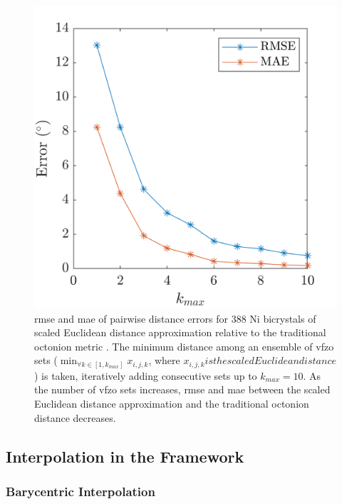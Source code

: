 \documentclass[preprint,12pt]{elsarticle}
\begin{document}
\begin{figure}
    \centering
    \includegraphics[scale=1]{figures/dist-ensemble-rmse-mae.png}
    \caption{\Gls{rmse} and \gls{mae} of pairwise distance errors for 388 Ni bicrystals \cite{olmstedSurveyComputedGrain2009a} of scaled Euclidean distance approximation relative to the traditional octonion metric \cite{chesserLearningGrainBoundary2020}. The minimum distance among an ensemble of \gls{vfzo} sets ($\min_{\forall k \in [1,k_{max}]}x_{i,j,k}$, where $x_{i,j,k} is the scaled Euclidean distance$) is taken, iteratively adding consecutive sets up to $k_{max} = 10$. As the number of \gls{vfzo} sets increases, \gls{rmse} and \gls{mae} between the scaled Euclidean distance approximation and the traditional octonion distance decreases.}
    \label{fig:dist-ensemble-rmse-mae}
\end{figure}

\subsection{Interpolation in the  Framework}
\label{sec:methods:interp}

\subsubsection{Barycentric Interpolation}
\label{sec:methods:interp:bary}
\end{document}
